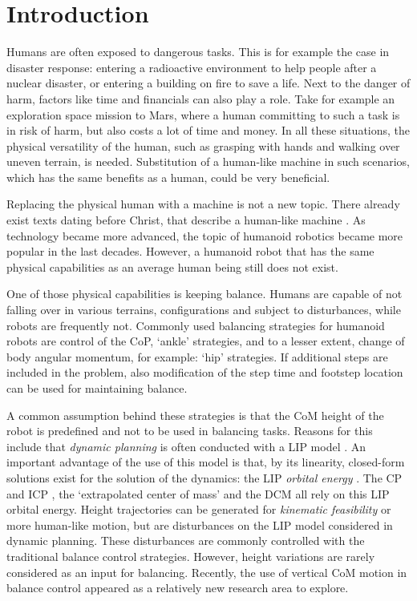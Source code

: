 %
\chapter{Introduction} \label{chap::intro}
Humans are often exposed to dangerous tasks. This is for example the case in disaster response: entering a radioactive environment to help people after a nuclear disaster, or entering a building on fire to save a life. Next to the danger of harm, factors like time and financials can also play a role. Take for example an exploration space mission to Mars, where a human committing to such a task is in risk of harm, but also costs a lot of time and money. In all these situations, the physical versatility of the human, such as grasping with hands and walking over uneven terrain, is needed. Substitution of a human-like machine in such scenarios, which has the same benefits as a human, could be very beneficial. 

Replacing the physical human with a machine is not a new topic. There already exist texts dating before Christ, that describe a human-like machine \cite{behnke2008humanoid}. As technology became more advanced, the topic of humanoid robotics became more popular in the last decades. However, a humanoid robot that has the same physical capabilities as an average human being still does not exist. 

One of those physical capabilities is keeping balance. Humans are capable of not falling over in various terrains, configurations and subject to disturbances, while robots are frequently not. Commonly used balancing strategies for humanoid robots are control of the \ac{CoP}, `ankle' strategies, and to a lesser extent, change of body angular momentum, for example: `hip' strategies. If additional steps are included in the problem, also modification of the step time and footstep location can be used for maintaining balance. 

A common assumption behind these strategies is that the \ac{CoM} height of the robot is predefined and not to be used in balancing tasks. Reasons for this include that \textit{dynamic planning} is often conducted with a \ac{LIP} model \cite{kajita20013d}. An important advantage of the use of this model is that, by its linearity, closed-form solutions exist for the solution of the dynamics: the \ac{LIP} \textit{orbital energy} \cite{kajita1992dynamic}. The \ac{CP} \cite{pratt2006capture} and \ac{ICP} \cite{koolen2012capturability}, the `extrapolated center of mass' \cite{hof2008extrapolated} and the \ac{DCM} \cite{takenaka2009real} all rely on this \ac{LIP} orbital energy. Height trajectories can be generated for \textit{kinematic feasibility} or more human-like motion, but are disturbances on the \ac{LIP} model considered in dynamic planning. These disturbances are commonly controlled with the traditional balance control strategies. However, height variations are rarely considered as an input for balancing. Recently, the use of vertical \ac{CoM} motion in balance control appeared as a relatively new research area to explore.

